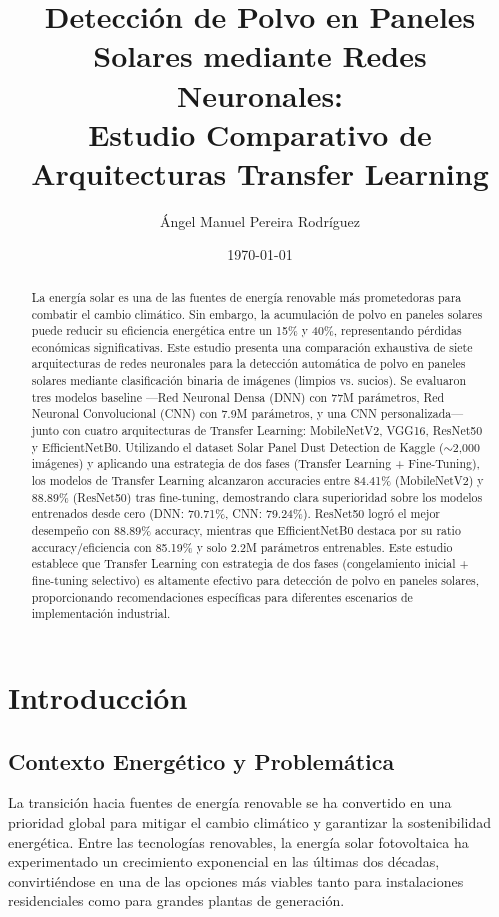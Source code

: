 \documentclass[11pt, a4paper]{article}
\title{\textbf{Detección de Polvo en Paneles Solares mediante Redes Neuronales:\\Estudio Comparativo de Arquitecturas Transfer Learning}}
\author{Ángel Manuel Pereira Rodríguez}
\date{\today}
\begin{document}
\maketitle

\begin{abstract}
La energía solar es una de las fuentes de energía renovable más prometedoras para combatir el cambio climático. Sin embargo, la acumulación de polvo en paneles solares puede reducir su eficiencia energética entre un 15\% y 40\%, representando pérdidas económicas significativas. Este estudio presenta una comparación exhaustiva de siete arquitecturas de redes neuronales para la detección automática de polvo en paneles solares mediante clasificación binaria de imágenes (limpios vs. sucios). Se evaluaron tres modelos baseline —Red Neuronal Densa (DNN) con 77M parámetros, Red Neuronal Convolucional (CNN) con 7.9M parámetros, y una CNN personalizada— junto con cuatro arquitecturas de Transfer Learning: MobileNetV2, VGG16, ResNet50 y EfficientNetB0. Utilizando el dataset Solar Panel Dust Detection de Kaggle ($\sim$2,000 imágenes) y aplicando una estrategia de dos fases (Transfer Learning + Fine-Tuning), los modelos de Transfer Learning alcanzaron accuracies entre 84.41\% (MobileNetV2) y 88.89\% (ResNet50) tras fine-tuning, demostrando clara superioridad sobre los modelos entrenados desde cero (DNN: 70.71\%, CNN: 79.24\%). ResNet50 logró el mejor desempeño con 88.89\% accuracy, mientras que EfficientNetB0 destaca por su ratio accuracy/eficiencia con 85.19\% y solo 2.2M parámetros entrenables. Este estudio establece que Transfer Learning con estrategia de dos fases (congelamiento inicial + fine-tuning selectivo) es altamente efectivo para detección de polvo en paneles solares, proporcionando recomendaciones específicas para diferentes escenarios de implementación industrial.
\end{abstract}

\tableofcontents
\listoftables
\clearpage

\section{Introducción}

\subsection{Contexto Energético y Problemática}

La transición hacia fuentes de energía renovable se ha convertido en una prioridad global para mitigar el cambio climático y garantizar la sostenibilidad energética. Entre las tecnologías renovables, la energía solar fotovoltaica ha experimentado un crecimiento exponencial en las últimas dos décadas, convirtiéndose en una de las opciones más viables tanto para instalaciones residenciales como para grandes plantas de generación.
\end{document}
